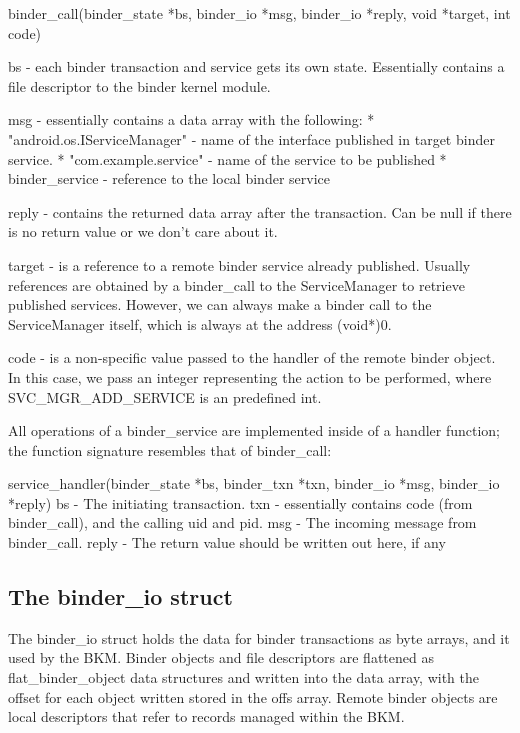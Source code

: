 \documentclass[prodmode]{acmlarge}
\begin{document}
\begin{snippet}
binder_call(binder_state *bs, binder_io *msg, binder_io *reply, void *target, int code)

bs -     each binder transaction and service gets its own state.
         Essentially contains a file descriptor to the binder kernel module.

msg -    essentially contains a data array with the following:
         * "android.os.IServiceManager" - name of the interface published in
                                          target binder service.
          * "com.example.service"       - name of the service to be  published
          * binder_service              - reference to the local binder
                                          service

reply -   contains the returned data array after the transaction. Can be null
          if there is no return value or we don't care about it.

target -  is a reference to a remote binder service already published. Usually
          references are obtained by a binder_call to the ServiceManager to retrieve
          published services. However, we can always make a binder call to the
          ServiceManager itself, which is always at the address (void*)0.

code -    is a non-specific value passed to the handler of the remote binder object.
          In this case, we pass an integer representing the action to be performed,
          where SVC_MGR_ADD_SERVICE is an predefined int.
\end{snippet}

All operations of a binder\_service are implemented inside of a handler function; the function signature resembles that of binder\_call:

\begin{snippet}
service_handler(binder_state *bs, binder_txn *txn,  binder_io *msg, binder_io *reply)
bs -      The initiating transaction.
txn -     essentially contains code (from binder_call), and the calling uid and pid.
msg -     The incoming message from binder_call.
reply -   The return value should be written out here, if any
\end{snippet}

\subsection{The binder\_io struct}
\label{app:binder_io}
The binder\_io struct holds the data for binder transactions as byte arrays, and it used by the BKM. Binder objects and file descriptors are flattened as flat\_binder\_object data structures and written into the data array, with the offset for each object written stored in the offs array. Remote binder objects are local descriptors that refer to records managed within the BKM.
\end{document}
